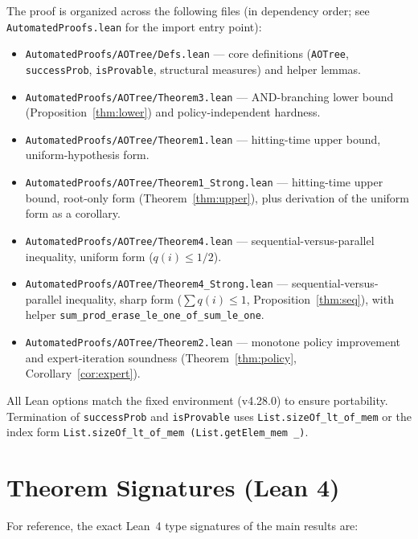 \documentclass[reqno,11pt]{amsart}
\newcommand{\lean}[1]{\textup{\texttt{\small #1}}}
\theoremstyle{plain}
\theoremstyle{definition}
\theoremstyle{remark}
\begin{document}
The proof is organized across the following files (in dependency order; see \texttt{AutomatedProofs.lean} for the import entry point):
\begin{itemize}[leftmargin=*, itemsep=2pt]
\item \texttt{AutomatedProofs/AOTree/Defs.lean} --- core definitions (\texttt{AOTree}, \texttt{successProb}, \texttt{isProvable}, structural measures) and helper lemmas.
\item \texttt{AutomatedProofs/AOTree/Theorem3.lean} --- AND-branching lower bound (Proposition~\ref{thm:lower}) and policy-independent hardness.
\item \texttt{AutomatedProofs/AOTree/Theorem1.lean} --- hitting-time upper bound, uniform-hypothesis form.
\item \texttt{AutomatedProofs/AOTree/Theorem1\_Strong.lean} --- hitting-time upper bound, root-only form (Theorem~\ref{thm:upper}), plus derivation of the uniform form as a corollary.
\item \texttt{AutomatedProofs/AOTree/Theorem4.lean} --- sequential-versus-parallel inequality, uniform form ($q(i) \le 1/2$).
\item \texttt{AutomatedProofs/AOTree/Theorem4\_Strong.lean} --- sequential-versus-parallel inequality, sharp form ($\sum q(i) \le 1$, Proposition~\ref{thm:seq}), with helper \lean{sum\_prod\_erase\_le\_one\_of\_sum\_le\_one}.
\item \texttt{AutomatedProofs/AOTree/Theorem2.lean} --- monotone policy improvement and expert-iteration soundness (Theorem~\ref{thm:policy}, Corollary~\ref{cor:expert}).
\end{itemize}
All Lean options match the fixed environment (v4.28.0) to ensure portability. Termination of \texttt{successProb} and \texttt{isProvable} uses \texttt{List.sizeOf\_lt\_of\_mem} or the index form \texttt{List.sizeOf\_lt\_of\_mem (List.getElem\_mem \_)}.

\section{Theorem Signatures (Lean 4)}\label{app:signatures}

For reference, the exact Lean~4 type signatures of the main results are:
\end{document}
